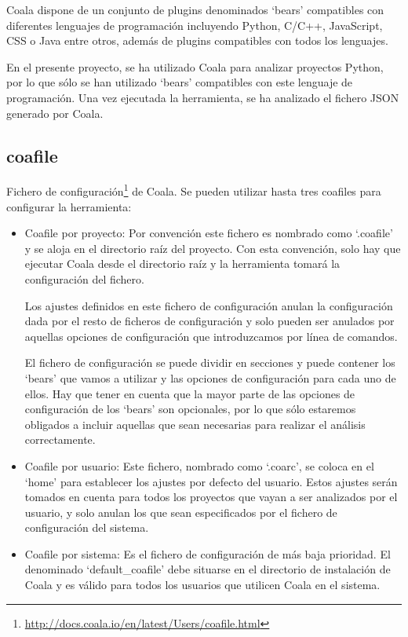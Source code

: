 \documentclass[a4paper, 12pt]{book}
\begin{document}
Coala dispone de un conjunto de plugins denominados `bears' compatibles con diferentes lenguajes de programación incluyendo Python, C/C++, JavaScript, CSS o Java entre otros, además de plugins compatibles con todos los lenguajes.

En el presente proyecto, se ha utilizado Coala para analizar proyectos Python, por lo que sólo se han utilizado `bears' compatibles con este lenguaje de programación. Una vez ejecutada la herramienta, se ha analizado el fichero JSON generado por Coala.

\subsection{coafile}
\label{sec:seccion1.1}
Fichero de configuración\footnote{\url{http://docs.coala.io/en/latest/Users/coafile.html}} de Coala. Se pueden utilizar hasta tres coafiles para configurar la herramienta:

\begin{itemize}
  \item Coafile por proyecto: Por convención este fichero es nombrado como `.coafile' y se aloja en  el directorio raíz del proyecto. Con esta convención, solo hay que ejecutar Coala desde el directorio raíz y la herramienta tomará la configuración del fichero.

Los ajustes definidos en este fichero de configuración anulan la configuración dada por el resto de ficheros de configuración y solo pueden ser anulados por aquellas opciones de configuración que introduzcamos por línea de comandos.

El fichero de configuración se puede dividir en secciones y puede contener los `bears' que vamos a utilizar y las opciones de configuración para cada uno de ellos. Hay que tener en cuenta que la mayor parte de las opciones de configuración de los `bears' son opcionales, por lo que sólo estaremos obligados a incluir aquellas que sean necesarias para realizar el análisis correctamente.
  \item Coafile por usuario: Este fichero, nombrado como `.coarc', se coloca en el `home' para establecer los ajustes por defecto del usuario. Estos ajustes serán tomados en cuenta para todos los proyectos que vayan a ser analizados por el usuario, y solo anulan los que sean especificados por el fichero de configuración del sistema.
  \item Coafile por sistema: Es el fichero de configuración de más baja prioridad. El denominado `default\_coafile' debe situarse en el directorio de instalación de Coala y es válido para todos los usuarios que utilicen Coala en el sistema.
\end{itemize}
\end{document}
